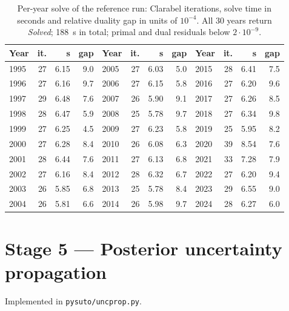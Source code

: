 \documentclass[11pt]{article}
\begin{document}
\begin{table}[h]
\centering\footnotesize
\setlength{\tabcolsep}{4pt}
\begin{tabular}{@{}lrrr@{\hskip 12pt}lrrr@{\hskip 12pt}lrrr@{}}
\toprule
Year & it. & s & gap & Year & it. & s & gap & Year & it. & s & gap \\
\midrule
1995 & 27 & 6.15 & 9.0 & 2005 & 27 & 6.03 & 5.0 & 2015 & 28 & 6.41 & 7.5 \\
1996 & 27 & 6.16 & 9.7 & 2006 & 27 & 6.15 & 5.8 & 2016 & 27 & 6.20 & 9.6 \\
1997 & 29 & 6.48 & 7.6 & 2007 & 26 & 5.90 & 9.1 & 2017 & 27 & 6.26 & 8.5 \\
1998 & 28 & 6.47 & 5.9 & 2008 & 25 & 5.78 & 9.7 & 2018 & 27 & 6.34 & 9.8 \\
1999 & 27 & 6.25 & 4.5 & 2009 & 27 & 6.23 & 5.8 & 2019 & 25 & 5.95 & 8.2 \\
2000 & 27 & 6.28 & 8.4 & 2010 & 26 & 6.08 & 6.3 & 2020 & 39 & 8.54 & 7.6 \\
2001 & 28 & 6.44 & 7.6 & 2011 & 27 & 6.13 & 6.8 & 2021 & 33 & 7.28 & 7.9 \\
2002 & 27 & 6.16 & 8.4 & 2012 & 28 & 6.32 & 6.7 & 2022 & 27 & 6.20 & 9.4 \\
2003 & 26 & 5.85 & 6.8 & 2013 & 25 & 5.78 & 8.4 & 2023 & 29 & 6.55 & 9.0 \\
2004 & 26 & 5.81 & 6.6 & 2014 & 26 & 5.98 & 9.7 & 2024 & 28 & 6.27 & 6.0 \\
\bottomrule
\end{tabular}
\caption{Per-year solve of the reference run: Clarabel iterations, solve
time in seconds and relative duality gap in units of $10^{-4}$. All 30 years
return \emph{Solved}; 188~s in total; primal and dual residuals below
$2\cdot10^{-9}$.}
\label{tab:si-solve}
\end{table}

\section{Stage 5 --- Posterior uncertainty propagation}\label{si:stage5}
Implemented in \texttt{pysuto/uncprop.py}.
\end{document}
